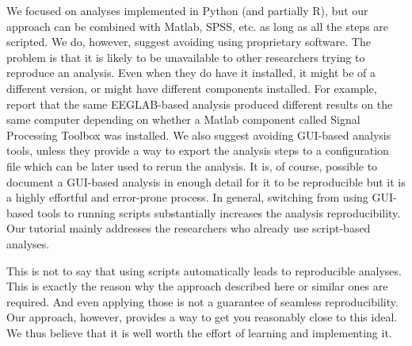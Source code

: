 \documentclass[a4paper,man,floatsintext,natbib]{apa6}
\begin{document}
We focused on analyses implemented in Python (and partially R), but our approach can be combined with Matlab, SPSS, etc. as long as all the steps are scripted.
We do, however, suggest avoiding using proprietary software.
The problem is that it is likely to be unavailable to other researchers trying to reproduce an analysis. Even when they do have it installed, it might be of a different version, or might have different components installed. For example, \cite{tauluPresentationElectromagneticMultichannel2005} report that the same EEGLAB-based analysis produced different results on the same computer depending on whether a Matlab component called Signal Processing Toolbox was installed.
We also suggest avoiding GUI-based analysis tools, unless they provide a way to export the analysis steps to a configuration file which can be later used to rerun the analysis.
It is, of course, possible to document a GUI-based analysis in enough detail for it to be reproducible but it is a highly effortful and error-prone process.
In general, switching from using GUI-based tools to running scripts substantially increases the analysis reproducibility.
Our tutorial mainly addresses the researchers who already use script-based analyses.

This is not to say that using scripts automatically leads to reproducible analyses. This is exactly the reason why the approach described here or similar ones are required. And even applying those is not a guarantee of seamless reproducibility. Our approach, however, provides a way to get you reasonably close to this ideal. We thus believe that it is well worth the effort of learning and implementing it.



\end{document}
